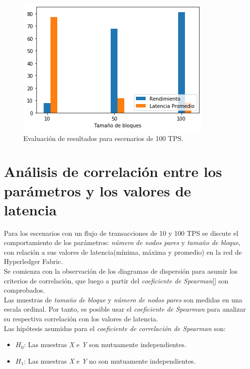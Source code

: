 \begin{figure}[htb]
\centering
\includegraphics[scale=0.6]{Graphics/Resultado100TPS.png}
\caption{Evaluaci\'on de resultados para escenarios de 100 TPS.}
\label{Resultado100TPS}
\end{figure}


\clearpage

\section{An\'alisis de correlaci\'on entre los par\'ametros y los valores de latencia}

Para los escenarios con un flujo de transacciones de 10 y 100 TPS se discute el comportamiento de los par\'ametros: \emph{n\'umero de nodos pares} y \emph{tama\~no de bloque}, con relaci\'on a sus valores de latencia(m\'inima, m\'axima y promedio) en la red de Hyperledger Fabric.\\

Se comienza con la observaci\'on de los diagramas de dispersi\'on para asumir los criterios de correlaci\'on, que luego a partir del \emph{coeficiente de Spearman}[\cite{barrera2014uso}] son comprobados.\\

Las muestras de \emph{tama\~no de bloque} y \emph{n\'umero de nodos pares} son medidas en una escala ordinal. Por tanto, es posible usar el \emph{coeficiente de Spearman} para analizar su respectiva correlaci\'on con los valores de latencia.\\

Las hip\'otesis asumidas para el \emph{coeficiente de correlaci\'on de Spearman} son:
\begin{itemize}
\item $H_0$: Las muestras \emph{X} e \emph{Y} son mutuamente independientes.
\item $H_1$: Las muestras \emph{X} e \emph{Y} no son mutuamente independientes.
\end{itemize}

